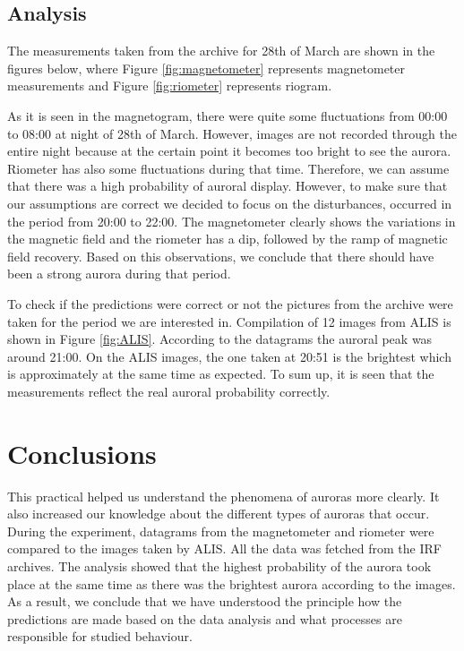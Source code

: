 \documentclass{article}
\begin{document}
\subsection{Analysis}
The measurements taken from the archive for 28th of March are shown in the figures below, where Figure \ref{fig:magnetometer} represents magnetometer measurements and Figure \ref{fig:riometer} represents riogram.

As it is seen in the magnetogram, there were quite some fluctuations from 00:00 to 08:00 at night of 28th of March. However, images are not recorded through the entire night because at the certain point it becomes too bright to see the aurora. Riometer has also some fluctuations during that time. Therefore, we can assume that there was a high probability of auroral display. However, to make sure that our assumptions are correct we decided to focus on the disturbances, occurred in the period from 20:00 to 22:00. The magnetometer clearly shows the variations in the magnetic field and the riometer has a dip, followed by the ramp of magnetic field recovery. Based on this observations, we conclude that there should have been a strong aurora during that period.

To check if the predictions were correct or not the pictures from the archive were taken for the period we are interested in. Compilation of 12 images from ALIS is shown in Figure \ref{fig:ALIS}. According to the datagrams the auroral peak was around 21:00. On the ALIS images, the one taken at 20:51 is the brightest which is approximately at the same time as expected. To sum up, it is seen that the measurements reflect the real auroral probability correctly.




\section{Conclusions}
This practical helped us understand the phenomena of auroras more clearly. It also increased our knowledge about the different types of auroras that occur. During the experiment, datagrams from the magnetometer and riometer were compared to the images taken by ALIS. All the data was fetched from the IRF archives. The analysis showed that the highest probability of the aurora took place at the same time as there was the brightest aurora according to the images. As a result, we conclude that we have understood the principle how the predictions are made based on the data analysis and what processes are responsible for studied behaviour.
\end{document}
